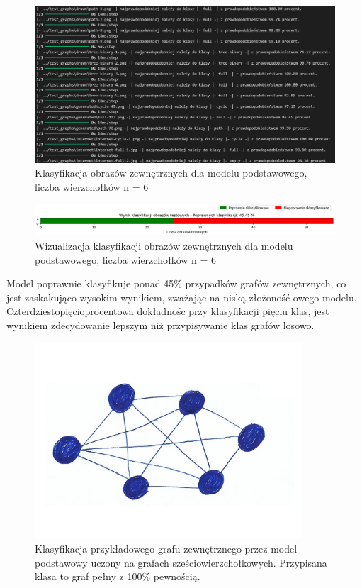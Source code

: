 \begin{figure}[ht]
	\centering
	\includegraphics[width=14cm]{resources/tests/images/v3/base6_txt.png}
	\caption{Klasyfikacja obrazów zewnętrznych dla modelu podstawowego, liczba wierzchołków n = 6}
	\label{Fig:tests-base-3b}
\end{figure}
\FloatBarrier

\begin{figure}[ht]
	\centering
	\includegraphics[width=14cm]{resources/tests/images/v3/base6_bar.png}
	\caption{Wizualizacja klasyfikacji obrazów zewnętrznych dla modelu podstawowego, liczba wierzchołków n = 6}
	\label{Fig:tests-base-3c}
\end{figure}
\FloatBarrier

Model poprawnie klasyfikuje ponad 45\% przypadków grafów zewnętrznych,
co jest zaskakująco wysokim wynikiem, zważając na niską złożoność owego modelu.
Czterdziestopięcioprocentowa dokładnośc przy klasyfikacji pięciu klas,
jest wynikiem zdecydowanie lepszym niż przypisywanie klas grafów losowo.

\begin{figure}[ht]
	\centering
	\includegraphics[width=10cm]{../graph_classification/test_graphs/drawn/full-9.png}
	\caption{Klasyfikacja przykładowego grafu zewnętrznego przez model podstawowy uczony na grafach sześciowierzchołkowych.
		Przypisana klasa to graf pełny z 100\% pewnością.}
	\label{Fig:tests-base-3d}
\end{figure}
\FloatBarrier

